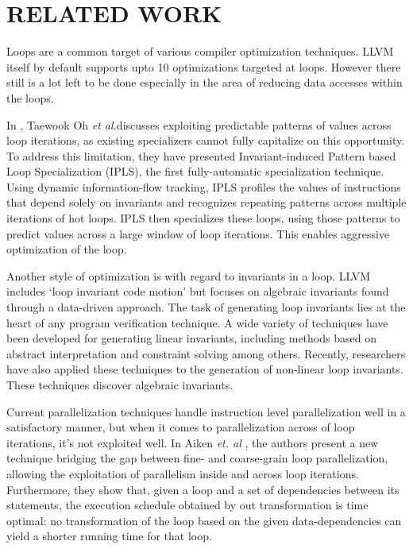 \chapter{RELATED WORK} %
Loops are a common target of various compiler optimization techniques. LLVM itself by default supports upto 10 optimizations targeted at loops. However there still is a lot left to be done especially in the area of reducing data accesses within the loops.

In \cite{oh2013practical}, Taewook Oh \textsl{et al.}discusses exploiting predictable patterns of values across loop iterations, as existing specializers cannot fully capitalize on this opportunity. To address this limitation, they have presented Invariant-induced Pattern based Loop Specialization (IPLS), the first fully-automatic specialization technique. Using dynamic information-flow tracking, IPLS profiles the values of instructions that depend solely on invariants and recognizes repeating patterns across multiple iterations of hot loops. IPLS then specializes these loops, using those patterns to predict values across a large window of loop iterations. This enables aggressive optimization of the loop.

Another style of optimization is with regard to invariants in a loop. LLVM includes ‘loop invariant code motion’ but \cite{sharma2013data} focuses on algebraic invariants found through a data-driven approach. The task of generating loop invariants lies at the heart of any program verification technique. A wide variety of techniques have been developed for generating linear invariants, including methods based on abstract interpretation and constraint solving among others. Recently, researchers have also applied these techniques to the generation of non-linear loop invariants. These techniques discover algebraic invariants.


Current parallelization techniques handle instruction level parallelization well in a satisfactory manner, but when it comes to parallelization across of loop iterations, it’s not exploited well. In Aiken \textsl{et. al} \cite{aiken1988optimal}, the authors present a new technique bridging the gap between fine- and coarse-grain loop parallelization, allowing the exploitation of parallelism inside and across loop iterations. Furthermore, they show that, given a loop and a set of dependencies between its statements, the execution schedule obtained by out transformation is time optimal: no transformation of the loop based on the given data-dependencies can yield a shorter running time for that loop.


